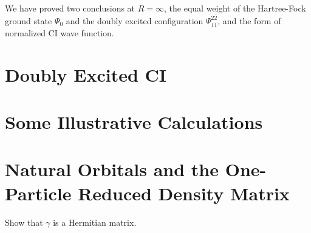 \documentclass[a4paper]{book}
\begin{document}
\begin{solution}
	We have proved two conclusions at $R = \infty$, the equal weight of the Hartree-Fock ground state $\Psi_0$ and the doubly excited configuration $\Psi^{2 \bar{2}}_{1 \bar{1}}$, and the form of normalized CI wave function.
		
	\end{solution}
	
	\section{Doubly Excited CI}
	
	\section{Some Illustrative Calculations}
	
	\section{Natural Orbitals and the One-Particle Reduced Density Matrix}
	
	\begin{exercise}
	Show that $\gamma$ is a Hermitian matrix.
	\end{exercise}
	
\end{document}
